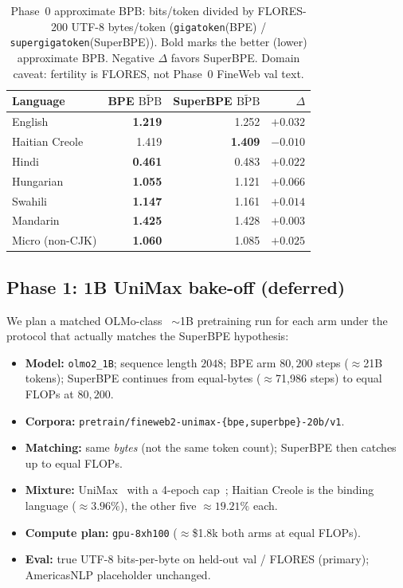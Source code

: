 \documentclass[11pt,a4paper]{article}
\begin{document}
\begin{table}[t]
\centering
\caption{Phase~0 approximate BPB: bits/token divided by FLORES-200 UTF-8 bytes/token
(\texttt{gigatoken}(BPE) / \texttt{supergigatoken}(SuperBPE)).
Bold marks the better (lower) approximate BPB. Negative $\Delta$ favors SuperBPE.
Domain caveat: fertility is FLORES, not Phase~0 FineWeb val text.}
\label{tab:phase0-approx-bpb}
\small
\begin{tabular}{@{}lrrr@{}}
\toprule
Language & BPE $\widetilde{\mathrm{BPB}}$ & SuperBPE $\widetilde{\mathrm{BPB}}$ & $\Delta$ \\
\midrule
English        & \textbf{1.219} & 1.252 & $+0.032$ \\
Haitian Creole & 1.419 & \textbf{1.409} & $-0.010$ \\
Hindi          & \textbf{0.461} & 0.483 & $+0.022$ \\
Hungarian      & \textbf{1.055} & 1.121 & $+0.066$ \\
Swahili        & \textbf{1.147} & 1.161 & $+0.014$ \\
Mandarin       & \textbf{1.425} & 1.428 & $+0.003$ \\
\midrule
Micro (non-CJK)& \textbf{1.060} & 1.085 & $+0.025$ \\
\bottomrule
\end{tabular}
\end{table}

\subsection{Phase 1: 1B UniMax bake-off (deferred)}
\label{sec:phase1}

We plan a matched OLMo-class~\citep{olmo2025} $\sim$1B pretraining run for each arm under the protocol that actually matches the SuperBPE hypothesis:

\begin{itemize}[leftmargin=*,itemsep=2pt]
  \item \textbf{Model:} \texttt{olmo2\_1B}; sequence length $2048$; BPE arm $80{,}200$ steps ($\approx$21B tokens); SuperBPE continues from equal-bytes ($\approx$71{,}986 steps) to equal FLOPs at $80{,}200$.
  \item \textbf{Corpora:} \texttt{pretrain/fineweb2-unimax-\{bpe,superbpe\}-20b/v1}.
  \item \textbf{Matching:} same \emph{bytes} (not the same token count); SuperBPE then catches up to equal FLOPs.
  \item \textbf{Mixture:} UniMax~\citep{chung2023unimax} with a 4-epoch cap~\citep{muennighoff2023scaling}; Haitian Creole is the binding language ($\approx 3.96\%$), the other five $\approx 19.21\%$ each.
  \item \textbf{Compute plan:} \texttt{gpu-8xh100} ($\approx$\$1.8k both arms at equal FLOPs).
  \item \textbf{Eval:} true UTF-8 bits-per-byte on held-out val / FLORES (primary); AmericasNLP placeholder unchanged.
\end{itemize}
\end{document}
